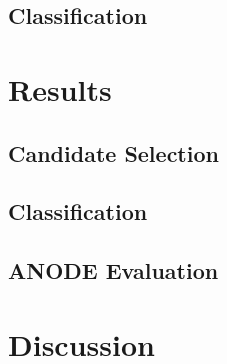 \documentclass[a4paper, 10pt, english, onecolumn]{article}
\begin{document}
	\subsection{Classification}



\section{Results}

	\subsection{Candidate Selection}


	\subsection{Classification}


	\subsection{ANODE Evaluation}


\section{Discussion}







{}

\end{document}
